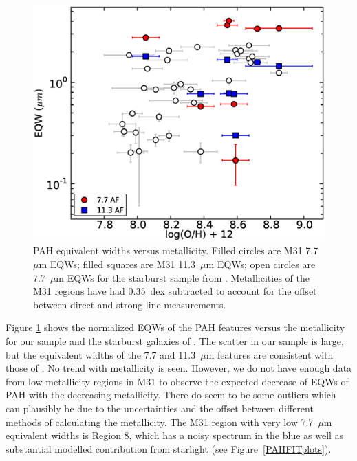\begin{figure}
\centering
\includegraphics[scale=0.27]{./oxyvseqw.eps}
\caption{ PAH equivalent widths versus metallicity. 
Filled circles are M31 7.7~$\mu$m EQWs; filled squares are M31 11.3~$\mu$m EQWs; 
open circles are 7.7~$\mu$m EQWs for the starburst sample from \citet{Engelbracht_2008}.
Metallicities of the M31 regions have had 0.35~dex subtracted to account for the offset  between direct and strong-line measurements. 
}
\label{metalicityVseqw}
\end{figure}

Figure \ref{metalicityVseqw} shows the normalized EQWs of the PAH features  versus the metallicity for our sample and the starburst 
galaxies of \citet{Engelbracht_2008}. The scatter in our sample is large, but the 	
equivalent widths of the 7.7 and 11.3~$\mu$m features are consistent with those of \citet{Engelbracht_2008}. 
No trend with metallicity is seen.
However, we do not have enough data from low-metallicity regions in M31 to observe the expected decrease of EQWs of PAH with the decreasing 
metallicity.  There do seem to be some outliers which can plausibly be due to the uncertainties  and the offset between different methods of calculating the metallicity.  
The M31 region with very low  7.7~$\mu$m  equivalent widths is Region 8, which has
a noisy spectrum in the blue as well as substantial modelled contribution from starlight (see Figure~\ref{PAHFITplots}).

